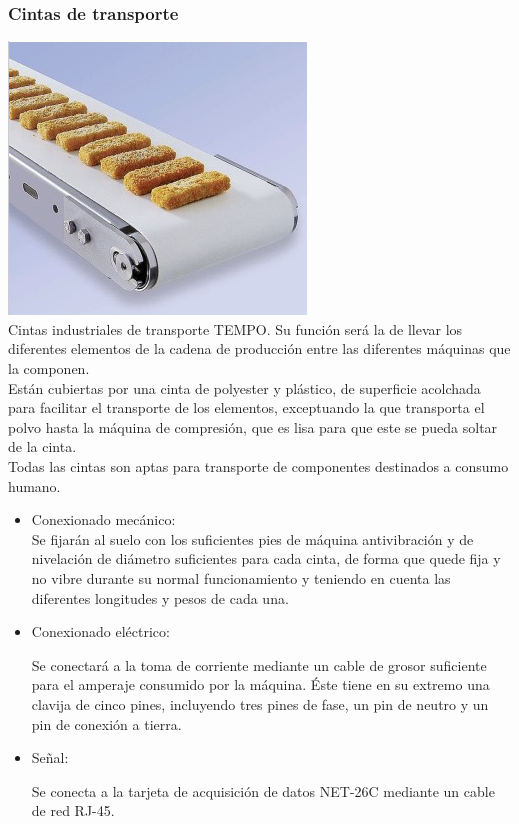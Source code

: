 \newpage


	\subsubsection{Cintas de transporte}

	\includegraphics[scale=0.5]{Datasheets/11Foto.png}
	\\

	Cintas industriales de transporte TEMPO. Su función será la de llevar los diferentes elementos de la cadena de producción entre las diferentes máquinas que la componen. \\

	Están cubiertas por una cinta de polyester y plástico, de superficie acolchada para facilitar el transporte de los elementos, exceptuando la que transporta el polvo hasta la máquina de compresión, que es lisa para que este se pueda soltar de la cinta. \\

	Todas las cintas son aptas para transporte de componentes destinados a consumo humano. 

		\begin{itemize}
				\item{Conexionado mecánico:}\\
				
				Se fijarán al suelo con los suficientes pies de máquina antivibración y de nivelación de diámetro suficientes para cada cinta, de forma que quede fija y no vibre durante su normal funcionamiento y teniendo en cuenta las diferentes longitudes y pesos de cada una.

				\item{Conexionado eléctrico:}

				Se conectará a la toma de corriente mediante un cable de grosor suficiente para el amperaje consumido por la máquina. Éste tiene en su extremo una clavija de cinco pines, incluyendo tres pines de fase, un pin de neutro y un pin de conexión a tierra.  
				
				\item{Señal:}

				Se conecta a la tarjeta de acquisición de datos NET-26C mediante un cable de red RJ-45.
		\end{itemize}


